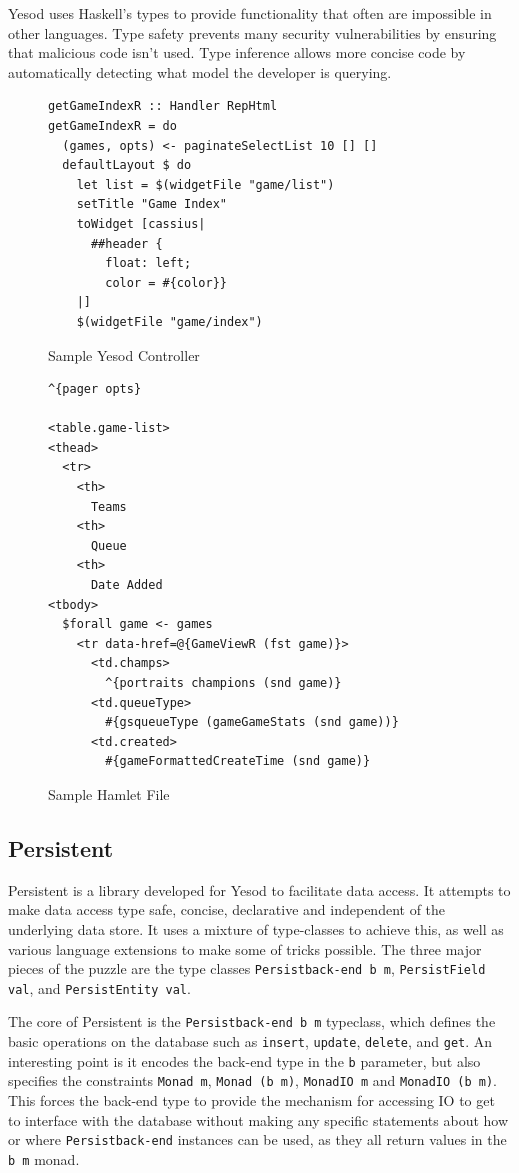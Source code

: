 \documentclass[letterpaper,twocolumn,9pt]{article}
\newcommand{\code}[1]{\texttt{#1}}
\begin{document}
Yesod uses Haskell's types to provide functionality that often are impossible in other languages. Type safety prevents many security vulnerabilities by ensuring that malicious code isn't used. Type inference allows more concise code by automatically detecting what model the developer is querying.


\begin{figure}[]
\begin{verbatim}
getGameIndexR :: Handler RepHtml
getGameIndexR = do
  (games, opts) <- paginateSelectList 10 [] []
  defaultLayout $ do
    let list = $(widgetFile "game/list")
    setTitle "Game Index"
    toWidget [cassius|
      ##header {
        float: left;
        color = #{color}}
    |] 
    $(widgetFile "game/index")
\end{verbatim}
    \caption{Sample Yesod Controller}
    \label{controller}
\end{figure}

\begin{figure}[]
\begin{verbatim}
^{pager opts}

<table.game-list>
<thead>
  <tr>
    <th>
      Teams
    <th>
      Queue
    <th>
      Date Added
<tbody>
  $forall game <- games
    <tr data-href=@{GameViewR (fst game)}>
      <td.champs>
        ^{portraits champions (snd game)}
      <td.queueType>
        #{gsqueueType (gameGameStats (snd game))}
      <td.created>
        #{gameFormattedCreateTime (snd game)}
\end{verbatim}
    \caption{Sample Hamlet File}
    \label{hamlet}
\end{figure}

\subsection{Persistent}

Persistent is a library developed for Yesod to facilitate data access.  It attempts to make data access type safe, concise, declarative and independent of the underlying data store.  It uses a mixture of type-classes to achieve this, as well as various language extensions to make some of tricks possible.  The three major pieces of the puzzle are the type classes \code{Persistback-end b m}, \code{PersistField val}, and \code{PersistEntity val}.

The core of Persistent is the \code{Persistback-end b m} typeclass, which defines the basic operations on the database such as \code{insert}, \code{update}, \code{delete}, and \code{get}.  An interesting point is it encodes the back-end type in the \code{b} parameter, but also specifies the constraints \code{Monad m}, \code{Monad (b m)}, \code{MonadIO m} and \code{MonadIO (b m)}.  This forces the back-end type to provide the mechanism for accessing IO to get to interface with the database without making any specific statements about how or where \code{Persistback-end} instances can be used, as they all return values in the \code{b m} monad.
\end{document}
